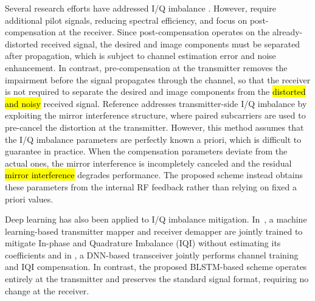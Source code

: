 \documentclass[lettersize,journal]{IEEEtran}
\begin{document}
Several research efforts have addressed I/Q imbalance \cite{REF7, REF8, REF9, Mirror_Image}.
However, \cite{REF7, REF8, REF9} require additional pilot signals, reducing spectral efficiency, and focus on post-compensation at the receiver.
Since post-compensation operates on the already-distorted received signal, the desired and image components must be separated after propagation, which is subject to channel estimation error and noise enhancement.
In contrast, pre-compensation at the transmitter removes the impairment before the signal propagates through the channel, so that the receiver is not required to separate the desired and image components from the \hl{distorted and noisy} received signal.
Reference \cite{Mirror_Image} addresses transmitter-side I/Q imbalance by exploiting the mirror interference structure, where paired subcarriers are used to pre-cancel the distortion at the transmitter.
However, this method assumes that the I/Q imbalance parameters are perfectly known a priori, which is difficult to guarantee in practice.
When the compensation parameters deviate from the actual ones, the mirror interference is incompletely canceled and the residual \hl{mirror interference} degrades performance.
The proposed scheme instead obtains these parameters from the internal RF feedback rather than relying on fixed a priori values.

Deep learning has also been applied to I/Q imbalance mitigation.
In~\cite{iqi_intel}, a machine learning-based transmitter mapper and receiver demapper are jointly trained to mitigate In-phase and Quadrature Imbalance (IQI) without estimating its coefficients and in \cite{dnn_otfs}, a DNN-based transceiver jointly performs channel training and IQI compensation.
In contrast, the proposed BLSTM-based scheme operates entirely at the transmitter and preserves the standard signal format, requiring no change at the receiver.
\end{document}
